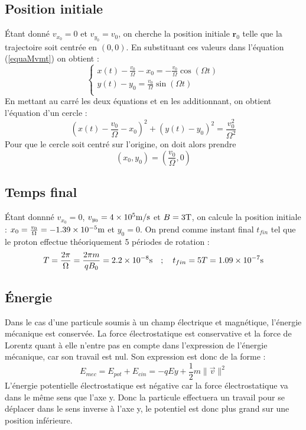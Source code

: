 \documentclass[a4paper,12pt,oneside]{article}
\def \be {\begin{equation}}
\def \ee {\end{equation}}
\begin{document}
\subsection{Position initiale}
Étant donné $v_{x_0}=0$ et $v_{y_0}=v_0$, on cherche la position initiale $\textbf{r}_0$ telle que la trajectoire soit centrée en  
$(0,0)$. En substituant ces valeurs dans l'équation (\ref{equaMvmt}) on obtient :
\be
\left\{\begin{array}{c}
x(t)-\frac{v_0}{\Omega} -x_0 = -\frac{v_0}{\Omega}\cos (\Omega t)\\
y(t)-y_0 = \frac{v_0}{\Omega}\sin (\Omega t)\\
\end{array} \right.
\ee
En mettant au carré les deux équations et en les additionnant, on obtient l'équation d'un cercle :
\be \label{equaCercle}
(x(t)-\frac{v_0}{\Omega} -x_0)^{2} + (y(t)-y_0)^2 = \frac{v_0^2}{\Omega^2}
\ee
Pour que le cercle soit centré sur l'origine, on doit alors prendre 
\be \label{PosIni}
(x_0,y_0) = (\frac{v_0}{\Omega},0) 
\ee

\subsection{Temps final \label{tFin}}
Étant donnné $v_{x_0}=0$, $v_{y_0}=4\times 10^{5}  \rm m/s$ et $B=3 \rm T$, on calcule la position initiale : $x_0=\frac{v_0}{\Omega}=-1.39\times10^{-5} \rm m$ et $y_{0}=0$. On prend comme instant final $t_{fin}$ tel que le proton effectue théoriquement 5 périodes de rotation : 
\be
T=\frac{2\pi}{\Omega}=\frac{2\pi m}{qB_0}=2.2\times 10^{-8} {\rm s} \quad ;\quad  t_{fin}=5T=1.09 \times 10^{-7} \rm s 
\ee

\subsection{Énergie} 
Dans le cas d'une particule soumis à un champ électrique et magnétique, l'énergie mécanique est conservée. La force électrostatique est conservative  et la force de Lorentz quant à elle n'entre pas en compte dans l'expression de l'énergie mécanique, car son travail est nul. Son expression est donc de la forme :
\be
E_{mec}=E_{pot}+E_{cin}=-qEy+\frac{1}{2}m\|\vec{v}\|^2
\ee
L'énergie potentielle électrostatique est négative car la force électrostatique va dans le même sens que l'axe y. Donc la particule effectuera un travail pour se déplacer dans le sens inverse à l'axe y, le potentiel est donc plus grand sur une position inférieure.
\end{document}
